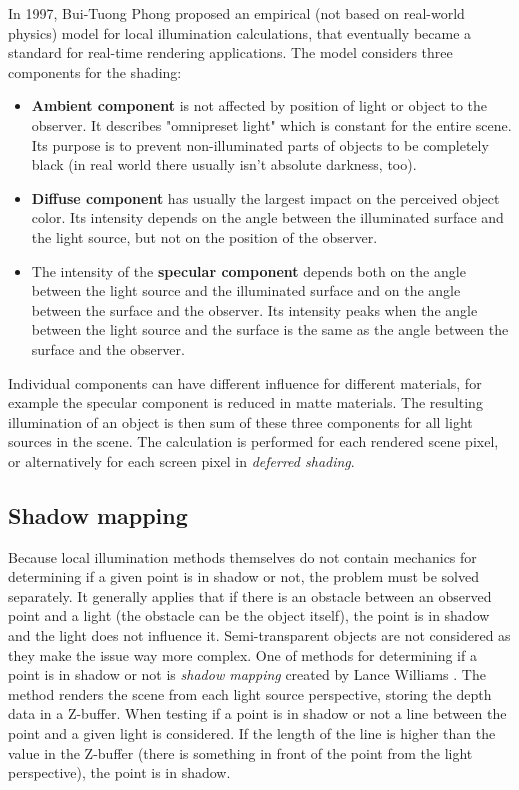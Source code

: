 In 1997, Bui-Tuong Phong \cite{PhongBui1975Ifcg} proposed an empirical (not based on real-world physics) model for local illumination calculations, that eventually became a standard for real-time rendering applications. The model considers three components for the shading:
\begin{itemize}
	\item \textbf{Ambient component} is not affected by position of light or object to the observer. It describes "omnipreset light" which is constant for the entire scene. Its purpose is to prevent non-illuminated parts of objects to be completely black (in real world there usually isn't absolute darkness, too).
	\item \textbf{Diffuse component} has usually the largest impact on the perceived object color. Its intensity depends on the angle between the illuminated surface and the light source, but not on the position of the observer.
	\item The intensity of the \textbf{specular component} depends both on the angle between the light source and the illuminated surface and on the angle between the surface and the observer. Its intensity peaks when the angle between the light source and the surface is the same as the angle between the surface and the observer.
\end{itemize}

Individual components can have different influence for different materials, for example the specular component is reduced in matte materials. The resulting illumination of an object is then sum of these three components for all light sources in the scene. The calculation is performed for each rendered scene pixel, or alternatively for each screen pixel in \textit{deferred shading}.

\subsection{Shadow mapping}
Because local illumination methods themselves do not contain mechanics for determining if a given point is in shadow or not, the problem must be solved separately. It generally applies that if there is an obstacle between an observed point and a light (the obstacle can be the object itself), the point is in shadow and the light does not influence it. Semi-transparent objects are not considered as they make the issue way more complex. One of methods for determining if a point is in shadow or not is \textit{shadow mapping} created by Lance Williams \cite{WilliamsLance1978Ccso}. The method renders the scene from each light source perspective, storing the depth data in a Z-buffer. When testing if a point is in shadow or not a line between the point and a given light is considered. If the length of the line is higher than the value in the Z-buffer (there is something in front of the point from the light perspective), the point is in shadow.

